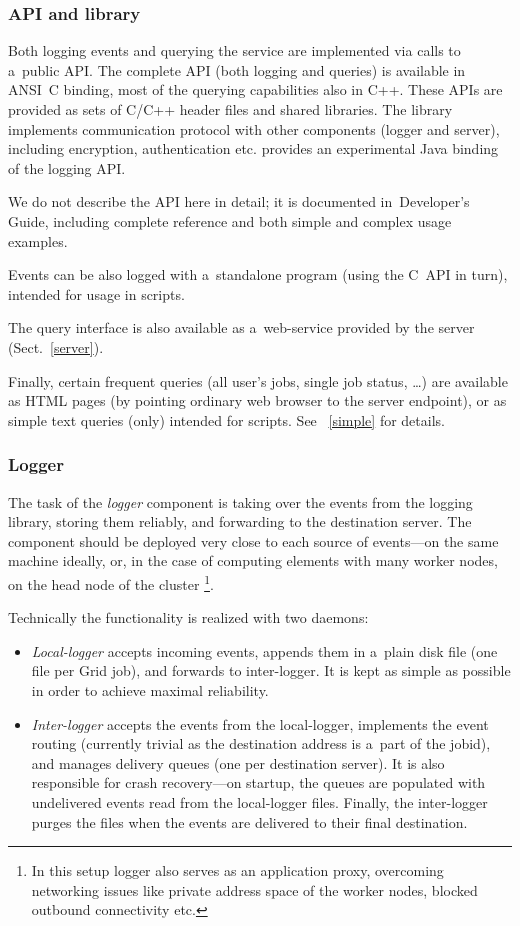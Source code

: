 \subsubsection{\LB API and library}
Both logging events and querying the service are implemented via
calls to a~public \LB API.
The complete API (both logging and queries)
is available in ANSI~C binding, most of the querying capabilities also in C++.
These APIs are provided as sets of C/C++ header files and shared libraries.
The library implements communication protocol with other \LB components
(logger and server), including encryption, authentication etc.
\LBnew provides an experimental Java binding of the logging API.

We do not describe the API here in detail; it is documented in~\LB Developer's
Guide\cite{lbdg},
including complete reference and both simple and complex usage examples.

Events can be also logged with a~standalone program (using the C~API in turn),
intended for usage in scripts.

The query interface is also available as a~web-service provided by the
\LB server (Sect.~\ref{server}).

Finally, certain frequent queries (all user's jobs, single job status, \dots)
are available as HTML pages (by pointing ordinary web browser to the \LB server
endpoint), or as simple text queries (\LBnew only) intended for scripts.
See~%
\ifx\insideUG\undefined
\cite{lbug}
\else
\ref{simple}
\fi
for details.

\subsubsection{Logger}
\label{comp:logger}
The task of the \emph{logger} component is taking over the events from
the logging library, storing them reliably, and forwarding to the destination
server.
The component should be deployed very close to each source of events---on the
same machine ideally, or, in the case of computing elements with many
worker nodes, on the head node of the cluster%
\footnote{In this setup logger also serves as an application proxy,
overcoming networking issues like private address space of the worker nodes,
blocked outbound connectivity etc.}.

Technically the functionality is realized with two daemons:
\begin{itemize}
\item \emph{Local-logger} accepts incoming events,
appends them in a~plain disk file (one file per Grid job),
and forwards to inter-logger.
It is kept as simple as possible in order to achieve
maximal reliability. 
\item \emph{Inter-logger} accepts the events from the local-logger,
implements the event routing (currently trivial as the destination
address is a~part of the jobid), and manages
delivery queues (one per destination server).
It is also responsible for crash recovery---on startup, the queues are
populated with undelivered events read from the local-logger files.
Finally, the inter-logger purges the files when the events are delivered to
their final destination.
\end{itemize}

